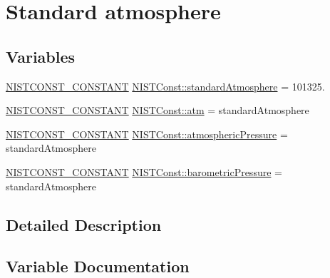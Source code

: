 \hypertarget{group___n_i_s_t_const-_standard_atmosphere}{}\section{Standard atmosphere}
\label{group___n_i_s_t_const-_standard_atmosphere}
\subsection*{Variables}
\begin{DoxyCompactItemize}
\item 
\mbox{\hyperlink{group___n_i_s_t_const-_macros_ga2b0fc1d7452373f816175dd86ce26729}{N\+I\+S\+T\+C\+O\+N\+S\+T\+\_\+\+C\+O\+N\+S\+T\+A\+NT}} \mbox{\hyperlink{group___n_i_s_t_const-_standard_atmosphere_ga6b5951b0dbdf131bb3138565e0828e79}{N\+I\+S\+T\+Const\+::standard\+Atmosphere}} = 101325.
\item 
\mbox{\hyperlink{group___n_i_s_t_const-_macros_ga2b0fc1d7452373f816175dd86ce26729}{N\+I\+S\+T\+C\+O\+N\+S\+T\+\_\+\+C\+O\+N\+S\+T\+A\+NT}} \mbox{\hyperlink{group___n_i_s_t_const-_standard_atmosphere_ga11e2a4d6ebd06cf99789d4bd0a98b503}{N\+I\+S\+T\+Const\+::atm}} = standard\+Atmosphere
\item 
\mbox{\hyperlink{group___n_i_s_t_const-_macros_ga2b0fc1d7452373f816175dd86ce26729}{N\+I\+S\+T\+C\+O\+N\+S\+T\+\_\+\+C\+O\+N\+S\+T\+A\+NT}} \mbox{\hyperlink{group___n_i_s_t_const-_standard_atmosphere_ga290009de599caeda81dd8578d350a6f8}{N\+I\+S\+T\+Const\+::atmospheric\+Pressure}} = standard\+Atmosphere
\item 
\mbox{\hyperlink{group___n_i_s_t_const-_macros_ga2b0fc1d7452373f816175dd86ce26729}{N\+I\+S\+T\+C\+O\+N\+S\+T\+\_\+\+C\+O\+N\+S\+T\+A\+NT}} \mbox{\hyperlink{group___n_i_s_t_const-_standard_atmosphere_gaa8cf0b181989db163a5305d0f3d3caad}{N\+I\+S\+T\+Const\+::barometric\+Pressure}} = standard\+Atmosphere
\end{DoxyCompactItemize}


\subsection{Detailed Description}


\subsection{Variable Documentation}
\mbox{\label{group___n_i_s_t_const-_standard_atmosphere_ga11e2a4d6ebd06cf99789d4bd0a98b503}} 

